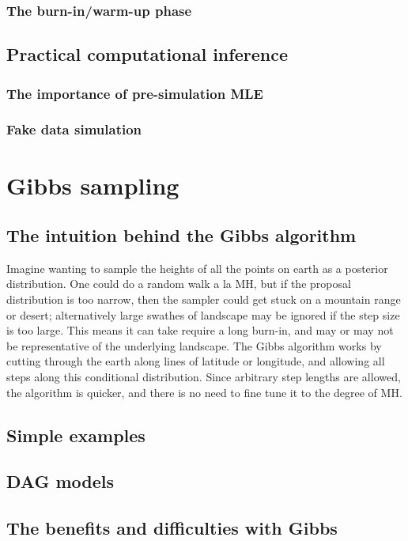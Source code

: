 \documentclass[11pt,fullpage]{book}
\begin{document}
\subsection{The burn-in/warm-up phase}

\section{Practical computational inference}
\subsection{The importance of pre-simulation MLE}
\subsection{Fake data simulation}

\chapter{Gibbs sampling}
\section{The intuition behind the Gibbs algorithm}
Imagine wanting to sample the heights of all the points on earth as a posterior distribution. One could do a random walk a la MH, but if the proposal distribution is too narrow, then the sampler could get stuck on a mountain range or desert; alternatively large swathes of landscape may be ignored if the step size is too large. This means it can take require a long burn-in, and may or may not be representative of the underlying landscape. The Gibbs algorithm works by cutting through the earth along lines of latitude or longitude, and allowing all steps along this conditional distribution. Since arbitrary step lengths are allowed, the algorithm is quicker, and there is no need to fine tune it to the degree of MH.

\section{Simple examples}
\section{DAG models}
\section{The benefits and difficulties with Gibbs}
\end{document}
